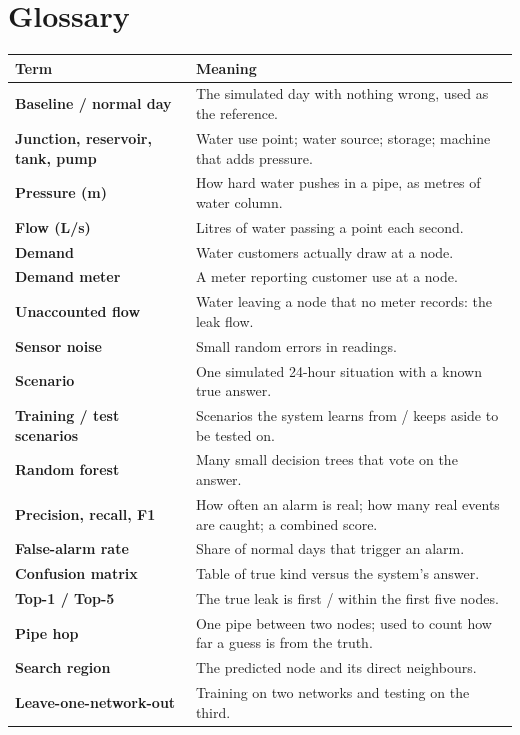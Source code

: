 \documentclass[11pt,a4paper]{article}
\begin{document}
\section{Glossary}
\begin{center}\small\begin{tabularx}{\linewidth}{@{}>{\bfseries}p{3.2cm}Y@{}}\toprule
Term & Meaning \\\midrule
Baseline / normal day & The simulated day with nothing wrong, used as the reference. \\
Junction, reservoir, tank, pump & Water use point; water source; storage; machine that adds pressure. \\
Pressure (m) & How hard water pushes in a pipe, as metres of water column. \\
Flow (L/s) & Litres of water passing a point each second. \\
Demand & Water customers actually draw at a node. \\
Demand meter & A meter reporting customer use at a node. \\
Unaccounted flow & Water leaving a node that no meter records: the leak flow. \\
Sensor noise & Small random errors in readings. \\
Scenario & One simulated 24-hour situation with a known true answer. \\
Training / test scenarios & Scenarios the system learns from / keeps aside to be tested on. \\
Random forest & Many small decision trees that vote on the answer. \\
Precision, recall, F1 & How often an alarm is real; how many real events are caught; a combined score. \\
False-alarm rate & Share of normal days that trigger an alarm. \\
Confusion matrix & Table of true kind versus the system's answer. \\
Top-1 / Top-5 & The true leak is first / within the first five nodes. \\
Pipe hop & One pipe between two nodes; used to count how far a guess is from the truth. \\
Search region & The predicted node and its direct neighbours. \\
Leave-one-network-out & Training on two networks and testing on the third. \\\bottomrule\end{tabularx}\end{center}
\end{document}
